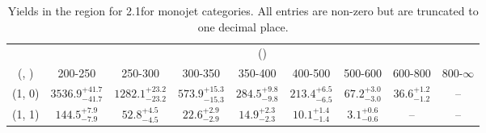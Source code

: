 \begin{table}[h!]
\tiny
\centering
\caption{Yields in the \mj region for 2.1\ifb for monojet categories. All entries are non-zero but are truncated to one decimal place.\label{tab:yieldsnodata_mu_comb_mono}}
\begin{tabular}
{ccccccccc}
	\hline\hline
	& \multicolumn{8}{c}{\scalht (\gev)} \\ 
	 (\njet,  \nb) & 200-250 & 250-300 & 300-350 & 350-400 & 400-500 & 500-600 & 600-800 & 800-$\infty$ \\ [0.8ex] 
\hline
	(1, 0) & $3536.9^{+ 41.7 }_{- 41.7 }$ & $1282.1^{+ 23.2 }_{- 23.2 }$ & $573.9^{+ 15.3 }_{- 15.3 }$ & $284.5^{+ 9.8 }_{- 9.8 }$ & $213.4^{+ 6.5 }_{- 6.5 }$ & $67.2^{+ 3.0 }_{- 3.0 }$ & $36.6^{+ 1.2 }_{- 1.2 }$ & -- \\[0.5ex] 
	(1, 1) & $144.5^{+ 7.9 }_{- 7.9 }$ & $52.8^{+ 4.5 }_{- 4.5 }$ & $22.6^{+ 2.9 }_{- 2.9 }$ & $14.9^{+ 2.3 }_{- 2.3 }$ & $10.1^{+ 1.4 }_{- 1.4 }$ & $3.1^{+ 0.6 }_{- 0.6 }$ & -- & -- \\[0.5ex] 
	\hline
	\hline
\end{tabular}
\end{table}
